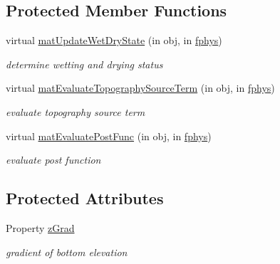 \subsection*{Protected Member Functions}
\begin{DoxyCompactItemize}
\item 
virtual \hyperlink{class_s_w_e_abstract2d_ab92b4b39e65c83f6eaced650e8e5d61c}{mat\+Update\+Wet\+Dry\+State} (in obj, in \hyperlink{class_ndg_phys_a6b25724fc9474d32018439009072f0a9}{fphys})
\begin{DoxyCompactList}\small\item\em determine wetting and drying status \end{DoxyCompactList}\item 
virtual \hyperlink{class_s_w_e_abstract2d_aec026e019146aa65c0c9f1476bd8dfc1}{mat\+Evaluate\+Topography\+Source\+Term} (in obj, in \hyperlink{class_ndg_phys_a6b25724fc9474d32018439009072f0a9}{fphys})
\begin{DoxyCompactList}\small\item\em evaluate topography source term \end{DoxyCompactList}\item 
virtual \hyperlink{class_s_w_e_abstract2d_a4f8ff718398e2caed60574f1602dd311}{mat\+Evaluate\+Post\+Func} (in obj, in \hyperlink{class_ndg_phys_a6b25724fc9474d32018439009072f0a9}{fphys})
\begin{DoxyCompactList}\small\item\em evaluate post function \end{DoxyCompactList}\end{DoxyCompactItemize}
\subsection*{Protected Attributes}
\begin{DoxyCompactItemize}
\item 
Property \hyperlink{class_s_w_e_abstract2d_a9646420b4380fecc669f1a1d2d2904b8}{z\+Grad}
\begin{DoxyCompactList}\small\item\em gradient of bottom elevation \end{DoxyCompactList}\end{DoxyCompactItemize}
